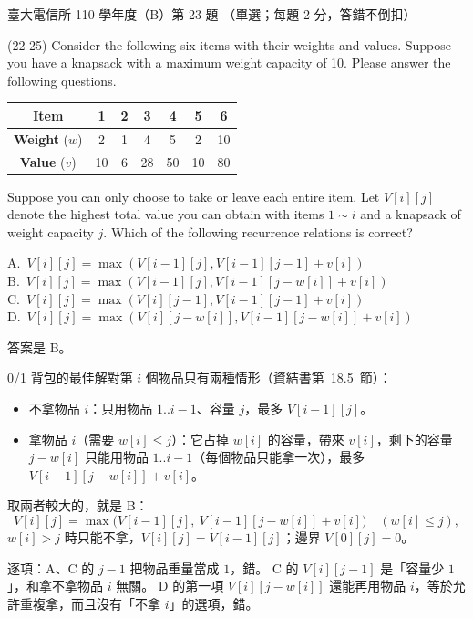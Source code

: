 \begin{pastexam}[label={px:ntu-110-comm-dsa-23}]{臺大電信所 110 學年度（B）第 23 題}
（單選；每題 2 分，答錯不倒扣）

(22-25) Consider the following six items with their weights and values. Suppose you have a knapsack with a maximum weight capacity of 10. Please answer the following questions.
\begin{center}
\begin{tabular}{|c|c|c|c|c|c|c|}
\hline
\textbf{Item} & \textbf{1} & \textbf{2} & \textbf{3} & \textbf{4} & \textbf{5} & \textbf{6}\\ \hline
\textbf{Weight} ($w$) & 2 & 1 & 4 & 5 & 2 & 10\\ \hline
\textbf{Value} ($v$) & 10 & 6 & 28 & 50 & 10 & 80\\ \hline
\end{tabular}
\end{center}

Suppose you can only choose to take or leave each entire item. Let $V[i][j]$ denote the highest total value you can obtain with items $1\sim i$ and a knapsack of weight capacity $j$. Which of the following recurrence relations is correct?

A.~$V[i][j]=\max(V[i-1][j],V[i-1][j-1]+v[i])$\\
B.~$V[i][j]=\max(V[i-1][j],V[i-1][j-w[i]]+v[i])$\\
C.~$V[i][j]=\max(V[i][j-1],V[i-1][j-1]+v[i])$\\
D.~$V[i][j]=\max(V[i][j-w[i]],V[i-1][j-w[i]]+v[i])$
\end{pastexam}

\begin{pastsoln}
答案是 B。

0/1 背包的最佳解對第 $i$ 個物品只有兩種情形（資結書第~18.5~節）：
\begin{itemize}
\item 不拿物品 $i$：只用物品 $1..i-1$、容量 $j$，最多 $V[i-1][j]$。
\item 拿物品 $i$（需要 $w[i] \le j$）：它占掉 $w[i]$ 的容量，帶來 $v[i]$，剩下的容量 $j - w[i]$ 只能用物品
$1..i-1$（每個物品只能拿一次），最多 $V[i-1][j - w[i]] + v[i]$。
\end{itemize}
取兩者較大的，就是 B：
\[
V[i][j] = \max\big(V[i-1][j],\ V[i-1][j - w[i]] + v[i]\big)\quad (w[i] \le j),
\]
$w[i] > j$ 時只能不拿，$V[i][j] = V[i-1][j]$；邊界 $V[0][j] = 0$。

逐項：A、C 的 $j - 1$ 把物品重量當成 $1$，錯。 C 的 $V[i][j-1]$ 是「容量少 $1$」，和拿不拿物品 $i$ 無關。
D 的第一項 $V[i][j - w[i]]$ 還能再用物品 $i$，等於允許重複拿，而且沒有「不拿 $i$」的選項，錯。
\end{pastsoln}
